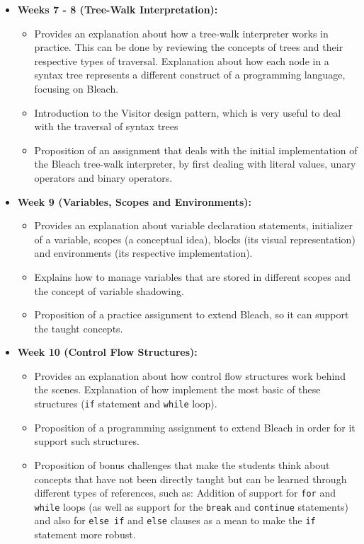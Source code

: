 \begin{itemize}
    \item \textbf{Weeks 7 - 8 (Tree-Walk Interpretation):}
        \begin{itemize}
            \item Provides an explanation about how a tree-walk interpreter works in practice. This can be done by reviewing the concepts of trees and their respective types of traversal. Explanation about how each node in a syntax tree represents a different construct of a programming language, focusing on Bleach.
            \item Introduction to the Visitor design pattern, which is very useful to deal with the traversal of syntax trees
            \item Proposition of an assignment that deals with the initial implementation of the Bleach tree-walk interpreter, by first dealing with literal values, unary operators and binary operators.
        \end{itemize}

    
    \item \textbf{Week 9 (Variables, Scopes and Environments):}
        \begin{itemize}
            \item Provides an explanation about variable declaration statements, initializer of a variable, scopes (a conceptual idea), blocks (its visual representation) and environments (its respective implementation). 
            \item Explains how to manage variables that are stored in different scopes and the concept of variable shadowing.
            \item Proposition of a practice assignment to extend Bleach, so it can support the taught concepts.
        \end{itemize}

    \item \textbf{Week 10 (Control Flow Structures):}
        \begin{itemize}
            \item Provides an explanation about how control flow structures work behind the scenes. Explanation of how implement the most basic of these structures (\texttt{if} statement and \texttt{while} loop).
            \item Proposition of a programming assignment to extend Bleach in order for it support such structures.
            \item Proposition of bonus challenges that make the students think about concepts that have not been directly taught but can be learned through different types of references, such as: Addition of support for \texttt{for} and \texttt{while} loops (as well as support for the \texttt{break} and \texttt{continue} statements) and also for \texttt{else if} and \texttt{else} clauses as a mean to make the \texttt{if} statement more robust.
        \end{itemize}


\end{itemize}
